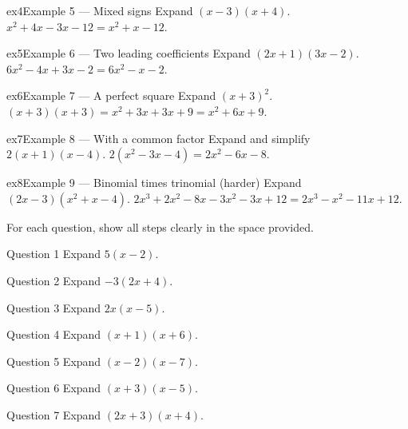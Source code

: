 \documentclass[11pt]{article}
\begin{document}
\begin{example}{ex4}{Example 5 --- Mixed signs}
Expand $(x-3)(x+4)$.
\soln $x^2+4x-3x-12=x^2+x-12.$
\end{example}

\begin{example}{ex5}{Example 6 --- Two leading coefficients}
Expand $(2x+1)(3x-2)$.
\soln $6x^2-4x+3x-2=6x^2-x-2.$
\end{example}

\begin{example}{ex6}{Example 7 --- A perfect square}
Expand $(x+3)^2$.
\soln $(x+3)(x+3)=x^2+3x+3x+9=x^2+6x+9.$
\end{example}

\begin{example}{ex7}{Example 8 --- With a common factor}
Expand and simplify $2(x+1)(x-4)$.
\soln $2(x^2-3x-4)=2x^2-6x-8.$
\end{example}

\begin{example}{ex8}{Example 9 --- Binomial times trinomial (harder)}
Expand $(2x-3)(x^2+x-4)$.
\soln $2x^3+2x^2-8x-3x^2-3x+12=2x^3-x^2-11x+12.$
\end{example}

\clearpage
{}
For each question, show all steps clearly in the space provided.

\begin{qbox}{Question 1}
Expand $5(x-2)$.\workspace{1.8cm}
\end{qbox}

\begin{qbox}{Question 2}
Expand $-3(2x+4)$.\workspace{1.8cm}
\end{qbox}

\begin{qbox}{Question 3}
Expand $2x(x-5)$.\workspace{1.8cm}
\end{qbox}

\begin{qbox}{Question 4}
Expand $(x+1)(x+6)$.\workspace{2.0cm}
\end{qbox}

\begin{qbox}{Question 5}
Expand $(x-2)(x-7)$.\workspace{2.0cm}
\end{qbox}

\begin{qbox}{Question 6}
Expand $(x+3)(x-5)$.\workspace{2.0cm}
\end{qbox}

\begin{qbox}{Question 7}
Expand $(2x+3)(x+4)$.\workspace{2.0cm}
\end{qbox}
\end{document}

